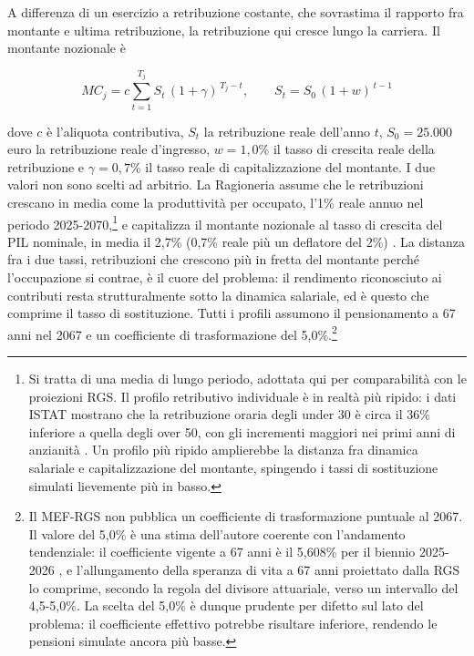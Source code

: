 \medskip
\noindent
A differenza di un esercizio a retribuzione costante, che sovrastima il rapporto
fra montante e ultima retribuzione, la retribuzione qui cresce lungo la carriera.
Il montante nozionale è

\begin{equation}
MC_j = c \sum_{t=1}^{T_j} S_t \,(1+\gamma)^{\,T_j - t},
\qquad S_t = S_0\,(1+w)^{\,t-1}
\label{eq:montante_profili}
\end{equation}

\noindent dove $c$ è l'aliquota contributiva, $S_t$ la retribuzione reale
dell'anno $t$, $S_0 = 25.000$ euro la retribuzione reale d'ingresso, $w = 1{,}0\%$
il tasso di crescita reale della retribuzione e $\gamma = 0{,}7\%$ il tasso reale
di capitalizzazione del montante. I due valori non sono scelti ad arbitrio. La
Ragioneria assume che le retribuzioni crescano in media come la produttività per
occupato, l'1\% reale annuo nel periodo 2025-2070,\footnote{Si tratta di una media
di lungo periodo, adottata qui per comparabilità con le proiezioni RGS. Il profilo
retributivo individuale è in realtà più ripido: i dati ISTAT mostrano che la
retribuzione oraria degli under 30 è circa il 36\% inferiore a quella degli over 50,
con gli incrementi maggiori nei primi anni di anzianità \cite{ISTAT_Retribuzioni2022}.
Un profilo più ripido amplierebbe la distanza fra dinamica salariale e capitalizzazione
del montante, spingendo i tassi di sostituzione simulati lievemente più in basso.} e capitalizza il montante
nozionale al tasso di crescita del PIL nominale, in media il 2,7\% (0,7\% reale
più un deflatore del 2\%) \cite{MEF_RGS2025_NdA}. La distanza fra i due tassi,
retribuzioni che crescono più in fretta del montante perché l'occupazione si
contrae, è il cuore del problema: il rendimento riconosciuto ai contributi resta
strutturalmente sotto la dinamica salariale, ed è questo che comprime il tasso di
sostituzione. Tutti i profili assumono il pensionamento a 67 anni nel 2067 e un
coefficiente di trasformazione del 5,0\%.\footnote{Il MEF-RGS non pubblica un coefficiente di
trasformazione puntuale al 2067. Il valore del 5,0\% è una stima dell'autore
coerente con l'andamento tendenziale: il coefficiente vigente a 67 anni è il
5,608\% per il biennio 2025-2026 \cite{MEF_RGS2025}, e l'allungamento della
speranza di vita a 67 anni proiettato dalla RGS lo comprime, secondo la regola
del divisore attuariale, verso un intervallo del 4,5-5,0\%. La scelta del 5,0\%
è dunque prudente per difetto sul lato del problema: il coefficiente effettivo
potrebbe risultare inferiore, rendendo le pensioni simulate ancora più basse.}

